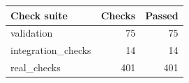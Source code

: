 \begin{tabular}{lrr}\toprule Check suite & Checks & Passed\\\midrule
validation & 75 & 75 \\
integration\_checks & 14 & 14 \\
real\_checks & 401 & 401 \\
\bottomrule\end{tabular}